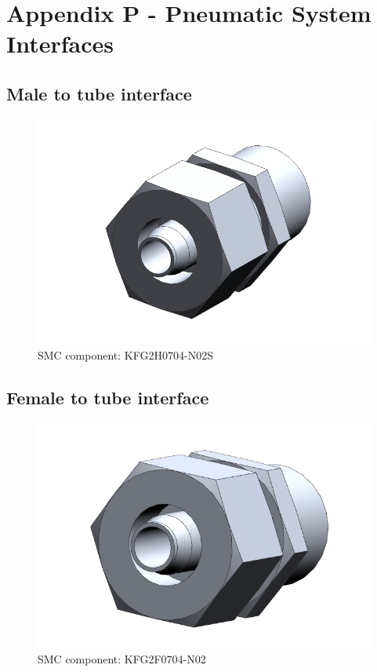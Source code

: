 \newpage
\section{Appendix P - Pneumatic System Interfaces}
\label{sec:appP}



\subsection{Male to tube interface}


\begin{figure}[H]
    \centering
    \includegraphics[width=1\textwidth]{appendix/img/interfaces/Interface_Male_Tube.png}
    \caption{SMC component: KFG2H0704-N02S}
    \label{fig:male_interface}
\end{figure}


\subsection{Female to tube interface}

\begin{figure}[H]
    \centering
    \includegraphics[width=1\textwidth]{appendix/img/interfaces/Interface_Female_Tube.png}
    \caption{SMC component: KFG2F0704-N02}
    \label{fig:FEmale_interface}
\end{figure}




